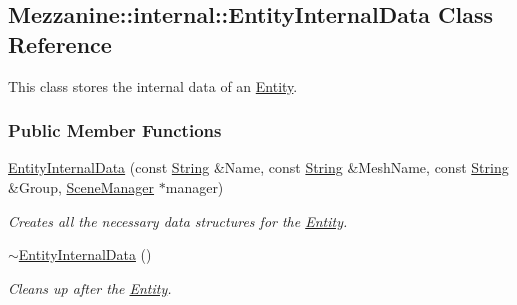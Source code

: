 \hypertarget{structMezzanine_1_1internal_1_1EntityInternalData}{
\subsection{Mezzanine::internal::EntityInternalData Class Reference}
\label{structMezzanine_1_1internal_1_1EntityInternalData}
}


This class stores the internal data of an \hyperlink{classMezzanine_1_1Entity}{Entity}.  


\subsubsection*{Public Member Functions}
\begin{DoxyCompactItemize}
\item 
\hypertarget{structMezzanine_1_1internal_1_1EntityInternalData_aa4e723b9a24a70e5d994f602c5faf0b4}{
\hyperlink{structMezzanine_1_1internal_1_1EntityInternalData_aa4e723b9a24a70e5d994f602c5faf0b4}{EntityInternalData} (const \hyperlink{namespaceMezzanine_acf9fcc130e6ebf08e3d8491aebcf1c86}{String} \&Name, const \hyperlink{namespaceMezzanine_acf9fcc130e6ebf08e3d8491aebcf1c86}{String} \&MeshName, const \hyperlink{namespaceMezzanine_acf9fcc130e6ebf08e3d8491aebcf1c86}{String} \&Group, \hyperlink{classMezzanine_1_1SceneManager}{SceneManager} $\ast$manager)}
\label{structMezzanine_1_1internal_1_1EntityInternalData_aa4e723b9a24a70e5d994f602c5faf0b4}

\begin{DoxyCompactList}\small\item\em Creates all the necessary data structures for the \hyperlink{classMezzanine_1_1Entity}{Entity}. \item\end{DoxyCompactList}\item 
\hypertarget{structMezzanine_1_1internal_1_1EntityInternalData_a9b771546491ffda20ef18203bc3aa128}{
\hyperlink{structMezzanine_1_1internal_1_1EntityInternalData_a9b771546491ffda20ef18203bc3aa128}{$\sim$EntityInternalData} ()}
\label{structMezzanine_1_1internal_1_1EntityInternalData_a9b771546491ffda20ef18203bc3aa128}

\begin{DoxyCompactList}\small\item\em Cleans up after the \hyperlink{classMezzanine_1_1Entity}{Entity}. \item\end{DoxyCompactList}\end{DoxyCompactItemize}
